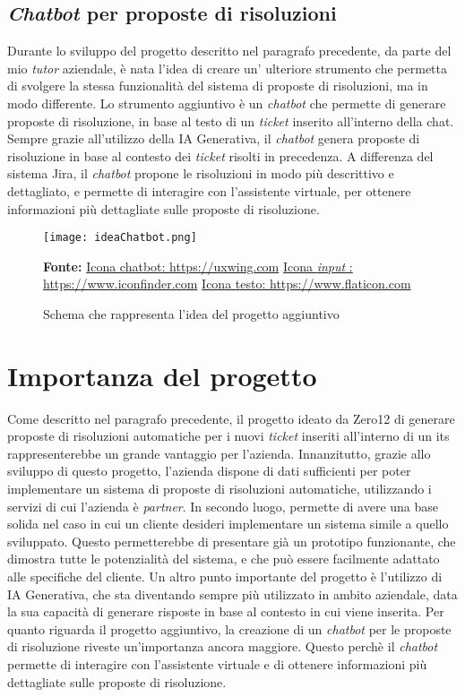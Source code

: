 \subsection{\textit{Chatbot} per proposte di risoluzioni}
Durante lo sviluppo del progetto descritto nel paragrafo precedente, da parte del mio \textit{tutor} aziendale, è nata l'idea di creare un' ulteriore strumento che permetta di svolgere la stessa funzionalità del sistema di proposte di risoluzioni, ma in modo differente. Lo strumento aggiuntivo è un \textit{chatbot} che permette di generare proposte di risoluzione, in base al testo di un \textit{ticket} inserito all'interno della chat. 
Sempre grazie all'utilizzo della IA Generativa, il \textit{chatbot} genera proposte di risoluzione in base al contesto dei \textit{ticket} risolti in precedenza. A differenza del sistema Jira, il \textit{chatbot} propone le risoluzioni in modo più descrittivo e dettagliato, e permette di interagire con l'assistente virtuale, per ottenere informazioni più dettagliate sulle proposte di risoluzione.
\begin{figure}[H]
    \centering
    \texttt{[image: ideaChatbot.png]}
    \caption{Schema che rappresenta l'idea del progetto aggiuntivo}
    \label{fig:ideaChatbot}
    \small \textbf{Fonte:} \href{https://uxwing.com/chatbot-icon/}{Icona chatbot: https://uxwing.com} \href{https://www.iconfinder.com/icons/351012/field_input_search_icon}{Icona \textit{input} : https://www.iconfinder.com} \href{https://www.flaticon.com/free-icon/text-file_5116156} {Icona testo: https://www.flaticon.com}

\end{figure}
\section{Importanza del progetto}
Come descritto nel paragrafo precedente, il progetto ideato da Zero12 di generare proposte di risoluzioni automatiche per i nuovi \textit{ticket} inseriti all'interno di un \gls{its} rappresenterebbe un grande vantaggio per l'azienda. Innanzitutto, 
grazie allo sviluppo di questo progetto, l'azienda dispone di dati sufficienti per poter implementare un sistema di proposte di risoluzioni automatiche, utilizzando i servizi di cui l'azienda è \textit{partner}. In secondo luogo, permette di avere una base solida nel 
caso in cui un cliente desideri implementare un sistema simile a quello sviluppato. Questo permetterebbe di presentare già un prototipo funzionante, che dimostra tutte le potenzialità del sistema, e che può essere facilmente adattato alle specifiche del cliente.
Un altro punto importante del progetto è l'utilizzo di IA Generativa, che sta diventando sempre più utilizzato in ambito aziendale, data la sua capacità di generare risposte in base al contesto in cui viene inserita.
Per quanto riguarda il progetto aggiuntivo, la creazione di un \textit{chatbot} per le proposte di risoluzione riveste un'importanza ancora maggiore. Questo perchè il \textit{chatbot} permette di interagire con l'assistente virtuale e di ottenere informazioni più dettagliate sulle proposte di risoluzione.
